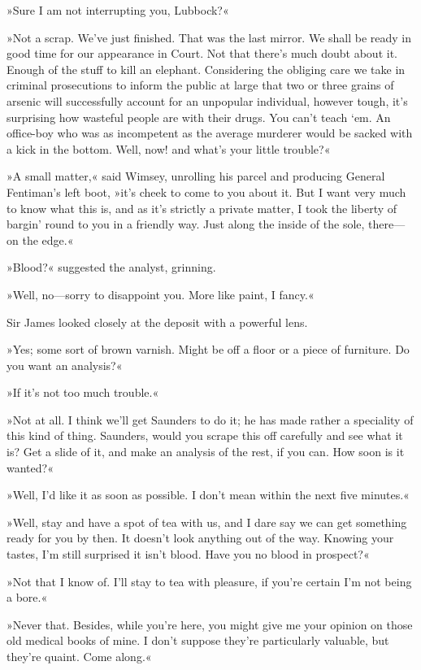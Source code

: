 »Sure I am not interrupting you, Lubbock?«

»Not a scrap. We've just finished. That was the last mirror. We shall be ready in good time for our appearance in Court. Not that there's much doubt about it. Enough of the stuff to kill an elephant. Considering the obliging care we take in criminal prosecutions to inform the public at large that two or three grains of arsenic will successfully account for an unpopular individual, however tough, it's surprising how wasteful people are with their drugs. You can't teach `em. An office-boy who was as incompetent as the average murderer would be sacked with a kick in the bottom. Well, now! and what's your little trouble?«

»A small matter,« said Wimsey, unrolling his parcel and producing General Fentiman's left boot, »it's cheek to come to you about it. But I want very much to know what this is, and as it's strictly a private matter, I took the liberty of bargin' round to you in a friendly way. Just along the inside of the sole, there—on the edge.«

»Blood?« suggested the analyst, grinning.

»Well, no—sorry to disappoint you. More like paint, I fancy.«

Sir James looked closely at the deposit with a powerful lens.

»Yes; some sort of brown varnish. Might be off a floor or a piece of furniture. Do you want an analysis?«

»If it's not too much trouble.«

»Not at all. I think we'll get Saunders to do it; he has made rather a speciality of this kind of thing. Saunders, would you scrape this off carefully and see what it is? Get a slide of it, and make an analysis of the rest, if you can. How soon is it wanted?«

»Well, I'd like it as soon as possible. I don't mean within the next five minutes.«

»Well, stay and have a spot of tea with us, and I dare say we can get something ready for you by then. It doesn't look anything out of the way. Knowing your tastes, I'm still surprised it isn't blood. Have you no blood in prospect?«

»Not that I know of. I'll stay to tea with pleasure, if you're certain I'm not being a bore.«

»Never that. Besides, while you're here, you might give me your opinion on those old medical books of mine. I don't suppose they're particularly valuable, but they're quaint. Come along.«

